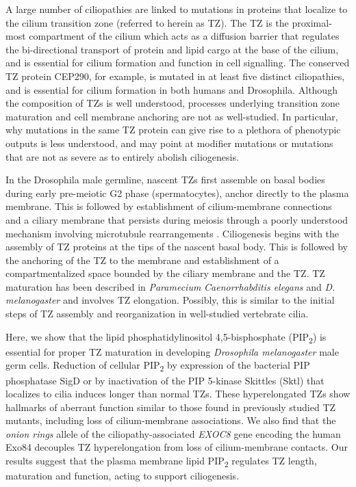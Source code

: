 \documentclass[12pt, twoside, letterpaper]{article}
\newcommand{\PIP}{PIP\textsubscript{2}}
\begin{document}
A large number of ciliopathies are linked to mutations in proteins that
localize to the cilium transition zone (referred to herein as TZ).
The TZ is the proximal-most compartment of the cilium which
acts as a diffusion barrier that regulates the
bi-directional transport of protein and lipid cargo at the base of the cilium,
and is essential for cilium formation and function in cell signalling.
The conserved TZ protein CEP290, for example, is mutated in at least
five distinct ciliopathies, and is essential for cilium formation in both humans
and Drosophila.
Although the composition of TZs is well understood, processes underlying
transition zone maturation and cell membrane anchoring are not as well-studied.
In particular, why mutations in the same TZ protein can give rise to a plethora
of phenotypic outputs is less understood, and may point at modifier mutations
or mutations that are not as severe as to entirely abolish ciliogenesis.

In the Drosophila male germline, nascent TZs first assemble on basal bodies
during early pre-meiotic G2 phase (spermatocytes), anchor directly to the plasma membrane.
This is followed by establishment of cilium-membrane connections and a
ciliary membrane that persists during meiosis \citep{riparbelli2012assembly}
through a poorly understood mechanism
involving microtubule rearrangements \citep{gottardo2013cilium}.
Ciliogenesis begins with the assembly of TZ proteins at the tips of
the nascent basal body.
This is followed by the anchoring of the TZ to the membrane and
establishment of a compartmentalized space bounded by the ciliary membrane
and the TZ.
TZ maturation has been described in
\textit{Paramecium} \citep{aubusson2015transition}
\textit{Caenorrhabditis elegans} \citep{serwas2017centrioles} and
\textit{D. melanogaster} \citep{gottardo2013cilium}
and involves TZ elongation.
Possibly, this is similar to the initial steps of TZ assembly and reorganization
in well-studied vertebrate cilia.

Here, we show that the lipid phosphatidylinositol 4,5-bisphosphate (\PIP{})
is essential for proper TZ maturation in developing \textit{Drosophila melanogaster}
male germ cells.
Reduction of cellular \PIP{} by expression of the bacterial PIP phosphatase SigD
or by inactivation of the PIP 5-kinase Skittles (Sktl) that localizes to cilia
induces longer than normal TZs.
These hyperelongated TZs show hallmarks of aberrant function similar to those
found in previously studied TZ mutants, including loss of cilium-membrane associations.
We also find that the \textit{onion rings} allele of the
ciliopathy-associated \textit{EXOC8} gene encoding the human Exo84
decouples TZ hyperelongation from loss of cilium-membrane contacts.
Our results suggest that the plasma membrane lipid \PIP{} regulates TZ length,
maturation and function, acting to support ciliogenesis.
\end{document}

